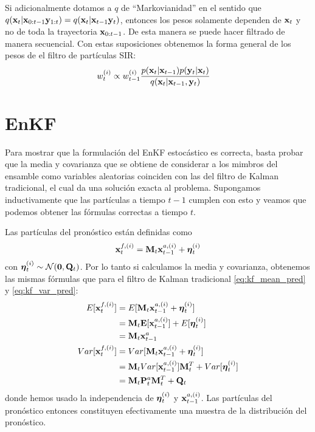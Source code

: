Si adicionalmente dotamos a $q$ de ``Markovianidad'' en el sentido que $q(\mathbf{x}_t | \mathbf{x}_{0:t-1} \mathbf{y}_{1:t}) = q(\mathbf{x}_t | \mathbf{x}_{t-1} \mathbf{y}_t)$, entonces los pesos solamente dependen de $\mathbf{x}_t$ y no de toda la trayectoria $\mathbf{x}_{0:t-1}$. De esta manera se puede hacer filtrado de manera secuencial. Con estas suposiciones obtenemos la forma general de los pesos de el filtro de partículas SIR:
\begin{align*}
    w_t^{(i)} &\propto w_{t-1}^{(i)} \frac{p(\mathbf{x}_t | \mathbf{x}_{t-1}) p(\mathbf{y}_t | \mathbf{x}_t)}{q(\mathbf{x}_t | \mathbf{x}_{t-1}, \mathbf{y}_t)}
\end{align*}

\section{EnKF} \label{appendix:enkf}

Para mostrar que la formulación del EnKF estocástico es correcta, basta probar que la media y covarianza que se obtiene de considerar a los mimbros del ensamble como variables aleatorias coinciden con las del filtro de Kalman tradicional, el cual da una solución exacta al problema. Supongamos inductivamente que las partículas a tiempo $t-1$ cumplen con esto y veamos que podemos obtener las fórmulas correctas a tiempo $t$.

Las partículas del pronóstico están definidas como 
$$ \mathbf{x}_t^{f, (i)} = \mathbf{M}_t \mathbf{x}_{t-1}^{a, (i)} + \mbox{\boldmath$ \eta $}_t^{(i)}$$
con $\mbox{\boldmath$ \eta $}_t^{(i)} \sim \mathcal{N}(\mathbf{0}, \mathbf{Q}_t)$. Por lo tanto si calculamos la media y covarianza, obtenemos las mismas fórmulas que para el filtro de Kalman tradicional \ref{eq:kf_mean_pred} y \ref{eq:kf_var_pred}:
\begin{align*}
    E[\mathbf{x}_t^{f, (i)}] &= E[\mathbf{M}_t \mathbf{x}_{t-1}^{a, (i)} + \mbox{\boldmath$ \eta $}_t^{(i)}] \\
    &= \mathbf{M}_t \mathbf{E}[\mathbf{x}_{t-1}^{a, (i)}] + E[\mbox{\boldmath$ \eta $}_t^{(i)}] \\
    &= \mathbf{M}_t \mathbf{x}_{t-1}^a \\
    Var[\mathbf{x}_t^{f, (i)}] &= Var[\mathbf{M}_t \mathbf{x}_{t-1}^{a, (i)} + \mbox{\boldmath$ \eta $}_t^{(i)}] \\
    &= \mathbf{M}_t Var[\mathbf{x}_{t-1}^{a, (i)}] \mathbf{M}_t^T + Var[\mbox{\boldmath$ \eta $}_t^{(i)}] \\
    &= \mathbf{M}_t \mathbf{P}_t^a \mathbf{M}_t^T + \mathbf{Q}_t 
\end{align*}
donde hemos usado la independencia de $\mbox{\boldmath$ \eta $}_t^{(i)}$ y $\mathbf{x}_{t-1}^{a, (i)}$. Las partículas del pronóstico entonces constituyen efectivamente una muestra de la distribución del pronóstico.

